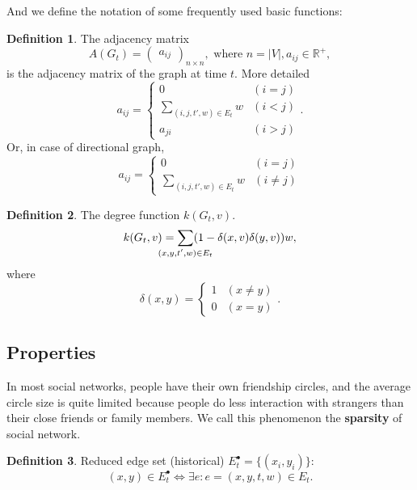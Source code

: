 \documentclass[12pt,abstract=true]{scrartcl}
\numberwithin{equation}{section}
\theoremstyle{definition}   \newtheorem{definition}{Definition}[section]
\theoremstyle{plain}        \newtheorem{theorem}{Theorem}[section]
\theoremstyle{plain}        \newtheorem{observation}{Observation}[section]
\theoremstyle{plain}        \newtheorem{fact}{Fact}[section]
\theoremstyle{plain}        \newtheorem{claim}{Claim}[section]
\theoremstyle{plain}        \newtheorem{lemma}[theorem]{Lemma}
\theoremstyle{plain}        \newtheorem{corollary}[theorem]{Corollary}
\theoremstyle{remark}       \newtheorem{example}{Example}[section]
\theoremstyle{remark}       \newtheorem{remark}{Remark}[section]
\begin{document}
And we define the notation of some frequently used basic functions:
\begin{definition}
The adjacency matrix
\begin{equation}
A(G_t)=\begin{pmatrix}a_{ij}\end{pmatrix}_{n\times n},\text{ where }n=|V|,
a_{ij}\in \mathbb{R}^+,
\end{equation}
is the adjacency matrix of the graph at time $t$. More detailed
\begin{equation}
a_{ij}=\begin{cases}
0&(i=j)\\
\sum_{(i,j,t',w)\in E_t}w &(i<j)\\
a_{ji}&(i>j)
\end{cases}.
\end{equation}
Or, in case of directional graph,
\begin{equation}
a_{ij}=\begin{cases}
0&(i=j)\\
\sum_{(i,j,t',w)\in E_t}w &(i\neq j)
\end{cases}
\end{equation}
\end{definition}

\begin{definition}
The degree function $k(G_t,v)$.
\begin{equation}
k(G_t,v)=\sum_{\mathclap{(x,y,t',w)\in E_t}}(1-\delta(x,v)\delta(y,v))w,
\end{equation}
where \begin{equation}
\delta(x,y)=\begin{cases}1&(x\neq y)\\0&(x=y)\end{cases}.
\end{equation}
\end{definition}

\subsection{Properties}
In most social networks, people have their own friendship circles, and the
average circle size is quite limited because people do less interaction with
strangers than their close friends or family members. We call this phenomenon
the \textbf{sparsity} of social network.

\begin{definition}
Reduced edge set (historical) $E_t^\bullet=\{(x_i,y_i)\}$:
\begin{equation}
(x,y)\in E_t^\bullet \iff \exists e: e=(x,y,t,w)\in E_t.
\end{equation}
\end{definition}
\end{document}
